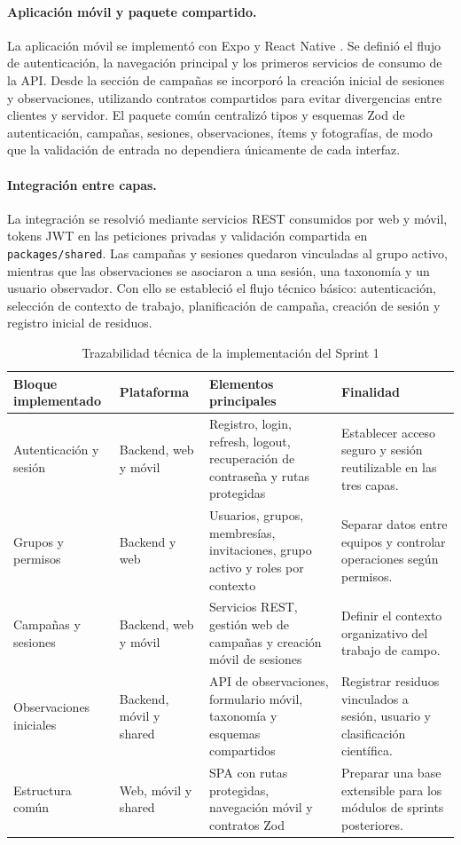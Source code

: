 \paragraph{Aplicación móvil y paquete compartido.}
La aplicación móvil se implementó con Expo y React Native \cite{expo,reactnative}. Se definió el flujo
de autenticación, la navegación principal y los primeros servicios de consumo
de la API. Desde la sección de campañas se incorporó la creación inicial de
sesiones y observaciones, utilizando contratos compartidos para evitar
divergencias entre clientes y servidor. El paquete común centralizó tipos y
esquemas Zod \cite{zod} de autenticación, campañas, sesiones, observaciones, ítems y
fotografías, de modo que la validación de entrada no dependiera únicamente de
cada interfaz.

\paragraph{Integración entre capas.}
La integración se resolvió mediante servicios REST consumidos por web y móvil,
tokens JWT en las peticiones privadas y validación compartida en
\texttt{packages/shared}. Las campañas y sesiones quedaron vinculadas al grupo
activo, mientras que las observaciones se asociaron a una sesión, una taxonomía
y un usuario observador. Con ello se estableció el flujo técnico básico:
autenticación, selección de contexto de trabajo, planificación de campaña,
creación de sesión y registro inicial de residuos.

\begin{table}[H]
\centering
\caption{Trazabilidad técnica de la implementación del Sprint 1}
\label{tab:implementacion_sprint1}
\scriptsize
\renewcommand{\arraystretch}{1.12}
\begin{tabularx}{\textwidth}{p{3.1cm}p{2.2cm}XX}
\toprule
Bloque implementado & Plataforma & Elementos principales & Finalidad \\
\midrule
Autenticación y sesión & Backend, web y móvil & Registro, login, refresh, logout, recuperación de contraseña y rutas protegidas & Establecer acceso seguro y sesión reutilizable en las tres capas. \\
Grupos y permisos & Backend y web & Usuarios, grupos, membresías, invitaciones, grupo activo y roles por contexto & Separar datos entre equipos y controlar operaciones según permisos. \\
Campañas y sesiones & Backend, web y móvil & Servicios REST, gestión web de campañas y creación móvil de sesiones & Definir el contexto organizativo del trabajo de campo. \\
Observaciones iniciales & Backend, móvil y shared & API de observaciones, formulario móvil, taxonomía y esquemas compartidos & Registrar residuos vinculados a sesión, usuario y clasificación científica. \\
Estructura común & Web, móvil y shared & SPA con rutas protegidas, navegación móvil y contratos Zod & Preparar una base extensible para los módulos de sprints posteriores. \\
\bottomrule
\end{tabularx}
\end{table}

